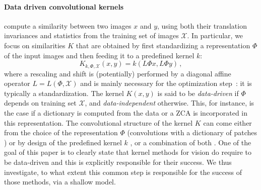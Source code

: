 \documentclass{article} %
\begin{document}
\paragraph{Data driven convolutional kernels} compute a similarity between two images $x$ and $y$, using both their translation invariances and statistics from the training set of images $\mathcal{X}$.
In particular, we focus on similarities $K$ that are obtained by first standardizing a representation $\Phi$ of the input images and then feeding it to a predefined kernel $k$:
\begin{equation}
    K_{k,\Phi,\mathcal{X}}(x,y)=k( L\Phi x,L\Phi y)\,,
    \end{equation}
where a rescaling and shift is (potentially) performed by a diagonal affine operator $L=L(\Phi,\mathcal{X})$ and is mainly necessary for the optimization step~\cite{jin2009data}: it is typically a standardization.
The kernel $K(x,y)$ is said to be \textit{data-driven}  if $\Phi$ depends on training set $\mathcal{X}$, and \textit{data-independent} otherwise.
This, for instance, is the case if a dictionary is  computed from the data \citep{li2019enhanced,mairal2016end} or a ZCA \citep{shankar2020neural} is incorporated in this representation.
The convolutional structure of the kernel $K$ can come either from the choice of the representation $\Phi$ (convolutions with a dictionary of patches \citep{coates2011analysis}) or by design of the predefined kernel $k$ \citep{shankar2020neural}, or a combination of both \citep{li2019enhanced,mairal2016end}.
One of the goal of this paper is to clearly state that  kernel methods for vision do require to be data-driven and this is explicitly responsible for their success. We thus investigate, to what extent this common step is responsible for the success of those methods, via a shallow model.
\end{document}
